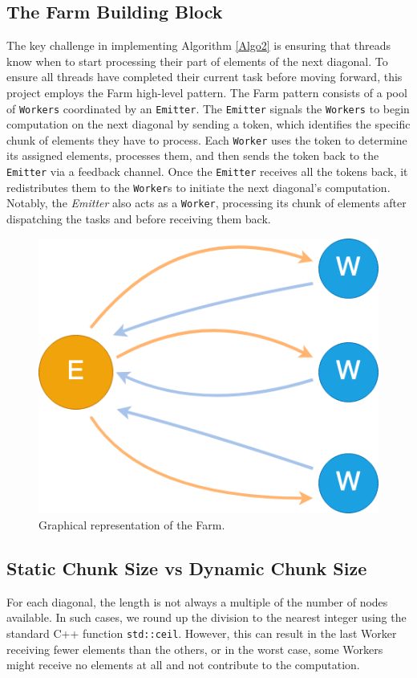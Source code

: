 \subsection*{The Farm Building Block}
The key challenge in implementing Algorithm \ref{Algo2} is ensuring that threads know when to start processing their part of elements of the next diagonal. To ensure all threads have completed their current task before moving forward, this project employs the Farm high-level pattern. The Farm pattern consists of a pool of \texttt{Workers} coordinated by an \texttt{Emitter}. The \texttt{Emitter} signals the \texttt{Workers} to begin computation on the next diagonal by sending a token, which identifies the specific chunk of elements they have to process. Each \texttt{Worker} uses the token to determine its assigned elements, processes them, and then sends the token back to the \texttt{Emitter} via a feedback channel. Once the \texttt{Emitter} receives all the tokens back, it redistributes them to the \texttt{Worker}s to initiate the next diagonal's computation. Notably, the \textit{Emitter} also acts as a \texttt{Worker}, processing its chunk of elements after dispatching the tasks and before receiving them back. 

\begin{figure}[h]
    \centering\includegraphics[scale=0.35]{img/FastFlow/Farm_graph.drawio.png}
    
    \caption{Graphical representation of the Farm.}
\end{figure}

\subsection*{Static Chunk Size vs Dynamic Chunk Size}
For each diagonal, the length is not always a multiple of the number of nodes available. In such cases, we round up the division to the nearest integer using the standard C++ function \texttt{std::ceil}. However, this can result in the last Worker receiving fewer elements than the others, or in the worst case, some Workers might receive no elements at all and not contribute to the computation.

